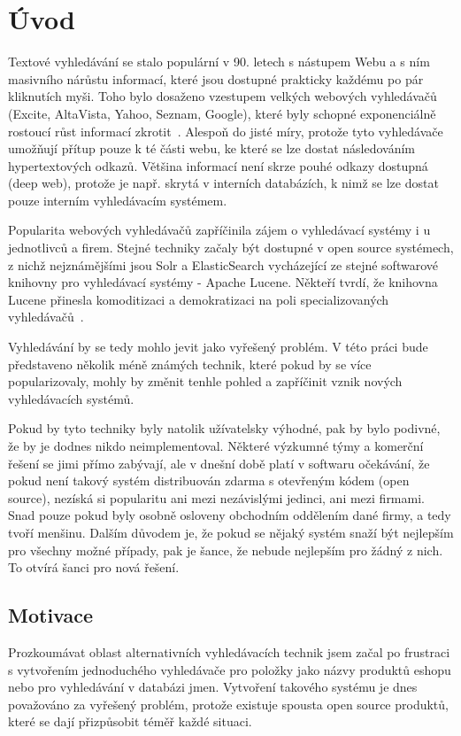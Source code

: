 \documentclass[11pt,letterpaper,oneside,openright]{book}
\begin{document}
\frontmatter
{\hypersetup{hidelinks}
    \tableofcontents
}

\mainmatter
\chapter{Úvod}
Textové vyhledávání se stalo populární v 90. letech s nástupem Webu a s ním
masivního nárůstu informací, které jsou dostupné prakticky každému po pár
kliknutích myši. Toho bylo dosaženo vzestupem velkých webových vyhledávačů
(Excite, AltaVista, Yahoo, Seznam, Google), které byly schopné exponenciálně
rostoucí růst informací zkrotit~\cite{search_history}. Alespoň do jisté míry,
protože tyto vyhledávače umožňují přítup pouze k té části webu, ke které se lze
dostat následováním hypertextových odkazů. Většina informací není skrze pouhé
odkazy dostupná (deep web), protože je např. skrytá v interních databázích, k
nimž se lze dostat pouze interním vyhledávacím systémem.

Popularita webových vyhledávačů zapříčinila zájem o vyhledávací systémy i u
jednotlivců a firem. Stejné techniky začaly být dostupné v open source
systémech, z nichž nejznámějšími jsou Solr a ElasticSearch vycházející ze
stejné softwarové knihovny pro vyhledávací systémy - Apache Lucene. Někteří
tvrdí, že knihovna Lucene přinesla komoditizaci a demokratizaci na poli
specializovaných vyhledávačů~\cite{dion_almaer,javaworld}.

Vyhledávání by se tedy mohlo jevit jako vyřešený problém. V této práci bude
představeno několik méně známých technik, které pokud by se více
popularizovaly, mohly by změnit tenhle pohled a zapříčinit vznik nových
vyhledávacích systémů.

Pokud by tyto techniky byly natolik užívatelsky výhodné, pak by bylo podivné,
že by je dodnes nikdo neimplementoval. Některé výzkumné týmy a komerční řešení
se jimi přímo zabývají, ale v dnešní době platí v softwaru očekávání, že pokud
není takový systém distribuován zdarma s otevřeným kódem (open source), nezíská
si popularitu ani mezi nezávislými jedinci, ani mezi firmami. Snad pouze pokud
byly osobně osloveny obchodním oddělením dané firmy, a tedy tvoří menšinu.
Dalším důvodem je, že pokud se nějaký systém snaží být nejlepším pro všechny
možné případy, pak je šance, že nebude nejlepším pro žádný z nich. To otvírá
šanci pro nová řešení.

\section{Motivace}
Prozkoumávat oblast alternativních vyhledávacích technik jsem začal po
frustraci s vytvořením jednoduchého vyhledávače pro položky jako názvy produktů
eshopu nebo pro vyhledávání v databázi jmen. Vytvoření takového systému je dnes
považováno za vyřešený problém, protože existuje spousta open source produktů,
které se dají přizpůsobit téměř každé situaci.
\end{document}

